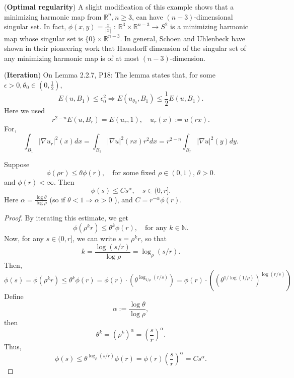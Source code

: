 \documentclass[a4paper,12pt]{article}
\begin{document}
\np (\textbf{Optimal regularity})
A slight modification of this example shows that a minimizing harmonic map from $\mathbb{R}^n, n \geq 3$, can have  $(n-3)$-dimensional singular set. In fact, $\phi(x, y)=\frac{x}{|x|}$ : $\mathbb{R}^3 \times \mathbb{R}^{n-3} \rightarrow S^2$ is a minimizing harmonic map whose singular set is $\{0\} \times \mathbb{R}^{n-3}$. In general, Schoen and Uhlenbeck have shown in their pioneering work  that Hausdorff dimension of the singular set of any minimizing harmonic map is of at most $(n-3)$-dimension.

\np \label{ite} (\textbf{Iteration})
On Lemma 2.2.7, P18: 
The lemma states that, for some $\epsilon >0, \theta _0 \in (0,\frac{1}{2})$,  
\begin{equation}\label{small}
    E(u,B_1) \leq \epsilon _0^2 \Rightarrow  E(u_{\theta _0},B_1) \leq \frac{1}{2} E(u,B_1).
\end{equation}
Here we used 
\begin{equation}
    r^{2-n}E(u,B_r) = E(u_r,1), \quad u_r(x):=u(rx).
\end{equation}
For, 
$$ \int_{B_1}^{}|\nabla u_r|^2(x) dx= \int_{B_1}^{}|\nabla u|^2(rx)r^{2}dx =r^{2-n}\int_{B_r}^{}|\nabla u|^2(y)dy . $$

\begin{lemma}
    Suppose 
\[
\phi(\rho r) \leq \theta \phi(r),
\quad \text{for some fixed } \rho \in (0,1), \, \theta >0.
\]
and $\phi (r) <\infty .$ 
Then 
\[
\phi(s) \leq C s^\alpha, \quad s \in (0,r].
\]
Here $\alpha =\frac{\log \theta}{\log \rho}$ (so if $\theta <1 \Rightarrow \alpha >0$ ), and $C=r^{-\alpha }\phi (r)$.  
\end{lemma}
\begin{proof}
    By iterating this estimate, we get
\[
\phi(\rho^k r) \leq \theta^k \phi(r), \quad \text{for any } k \in \mathbb{N}.
\]
Now, for any \( s \in (0, r] \), we can write \( s = \rho^k r \), so that
\[
k = \frac{\log(s/r)}{\log \rho} = \log_{\rho}(s/r).
\]
Then,
$$ \phi(s)=\phi\left(\rho^k r\right) \leq \theta^k \phi(r)=\phi(r) \cdot\left(\theta^{\log _{1 / \rho}(r / s)}\right)=\phi(r) \cdot\left(\left(\theta^{1 / \log (1 / \rho)}\right)^{\log (r / s)}\right) $$
Define 
\begin{equation}
    \alpha := \frac{\log \theta}{\log \rho} ,
\end{equation}
then 
$$ \theta ^k=(\rho ^k)^{\alpha }=(\frac{s}{r} )^{\alpha }.$$
Thus,
\[
\phi(s) \leq \theta^{\log_{\rho}(s/r)} \phi(r) = \phi(r) \left( \frac{s}{r} \right)^{\alpha} = C s^\alpha.
\]
\end{proof}
\end{document}
